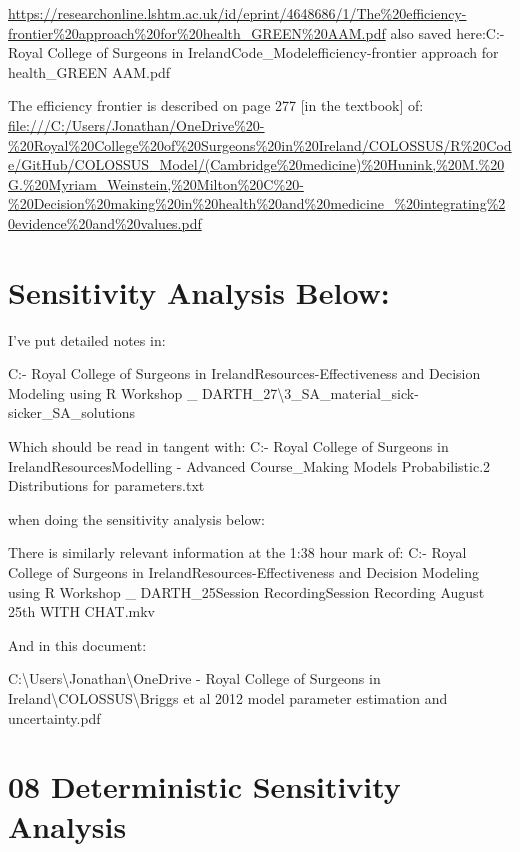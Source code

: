 \documentclass[
]{article}
\begin{document}
\url{https://researchonline.lshtm.ac.uk/id/eprint/4648686/1/The\%20efficiency-frontier\%20approach\%20for\%20health_GREEN\%20AAM.pdf}
also saved here:C:\Users\Jonathan\OneDrive - Royal College of Surgeons
in
Ireland\COLOSSUS\R Code\GitHub\COLOSSUS\_Model\The efficiency-frontier
approach for health\_GREEN AAM.pdf

The efficiency frontier is described on page 277 {[}in the textbook{]}
of:
\url{file:///C:/Users/Jonathan/OneDrive\%20-\%20Royal\%20College\%20of\%20Surgeons\%20in\%20Ireland/COLOSSUS/R\%20Code/GitHub/COLOSSUS_Model/(Cambridge\%20medicine)\%20Hunink,\%20M.\%20G.\%20Myriam_Weinstein,\%20Milton\%20C\%20-\%20Decision\%20making\%20in\%20health\%20and\%20medicine_\%20integrating\%20evidence\%20and\%20values.pdf}

\hypertarget{sensitivity-analysis-below}{%
\section{\texorpdfstring{\textbf{Sensitivity Analysis
Below:}}{Sensitivity Analysis Below:}}\label{sensitivity-analysis-below}}

I've put detailed notes in:

C:\Users\Jonathan\OneDrive - Royal College of Surgeons in
Ireland\COLOSSUS\Training Resources\Cost-Effectiveness and Decision
Modeling using R Workshop \_
DARTH\August\_27\textbackslash3\_SA\_material\markov\_sick-sicker\_SA\_solutions

Which should be read in tangent with: C:\Users\Jonathan\OneDrive - Royal
College of Surgeons in
Ireland\COLOSSUS\Training Resources\Decision Modelling - Advanced
Course\_Making Models Probabilistic.2 Distributions for
parameters\notes.txt

when doing the sensitivity analysis below:

There is similarly relevant information at the 1:38 hour mark of:
C:\Users\Jonathan\OneDrive - Royal College of Surgeons in
Ireland\COLOSSUS\Training Resources\Cost-Effectiveness and Decision
Modeling using R Workshop \_ DARTH\August\_25\Live Session
Recording\Live Session Recording August 25th WITH CHAT.mkv

And in this document:

C:\textbackslash Users\textbackslash Jonathan\textbackslash OneDrive -
Royal College of Surgeons in
Ireland\textbackslash COLOSSUS\textbackslash Briggs et al 2012 model
parameter estimation and uncertainty.pdf

\hypertarget{deterministic-sensitivity-analysis}{%
\section{08 Deterministic Sensitivity
Analysis}\label{deterministic-sensitivity-analysis}}
\end{document}
